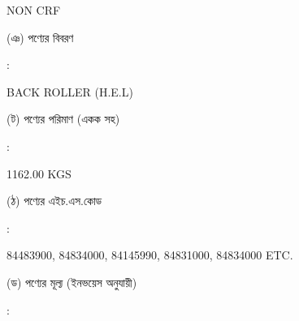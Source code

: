 \documentclass[12pt]{article}
\newcommand{\good}{BACK ROLLER (H.E.L)}
\newcommand{\pkg}{1162.00 KGS}
\newcommand{\crf}{NON CRF}
\newcommand{\crfdt}{}
\newcommand{\hscode}{84483900, 84834000, 84145990, 84831000, 84834000 ETC.  }
\begin{document}
\begin{minipage}[t]{0.53\linewidth}
{\crf} \hspace{2em} {\crfdt}
\\
\end{minipage}
\begin{minipage}[t]{0.05\linewidth}
\hspace*{1em}
\end{minipage}
\begin{minipage}[t]{0.40\linewidth}
(ঞ) পণ্যের বিবরণ
\end{minipage}
\begin{minipage}[t]{0.02\linewidth}
:
\end{minipage}
\begin{minipage}[t]{0.53\linewidth}
{\good}
\\
\end{minipage}
\begin{minipage}[t]{0.05\linewidth}
\hspace*{1em}
\end{minipage}
\begin{minipage}[t]{0.40\linewidth}
(ট) পণ্যের পরিমাণ (একক সহ)
\end{minipage}
\begin{minipage}[t]{0.02\linewidth}
:
\end{minipage}
\begin{minipage}[t]{0.53\linewidth}
{\pkg}
\\
\end{minipage}
\begin{minipage}[t]{0.05\linewidth}
\hspace*{1em}
\end{minipage}
\begin{minipage}[t]{0.40\linewidth}
(ঠ) পণ্যের এইচ.এস.কোড
\end{minipage}
\begin{minipage}[t]{0.02\linewidth}
:
\end{minipage}
\begin{minipage}[t]{0.53\linewidth}
{\hscode}
\\
\end{minipage}
\begin{minipage}[t]{0.05\linewidth}
\hspace*{1em}
\end{minipage}
\begin{minipage}[t]{0.40\linewidth}
(ড) পণ্যের মূল্য (ইনভয়েস অনুযায়ী)
\end{minipage}
\begin{minipage}[t]{0.02\linewidth}
:
\end{minipage}
\end{document}
